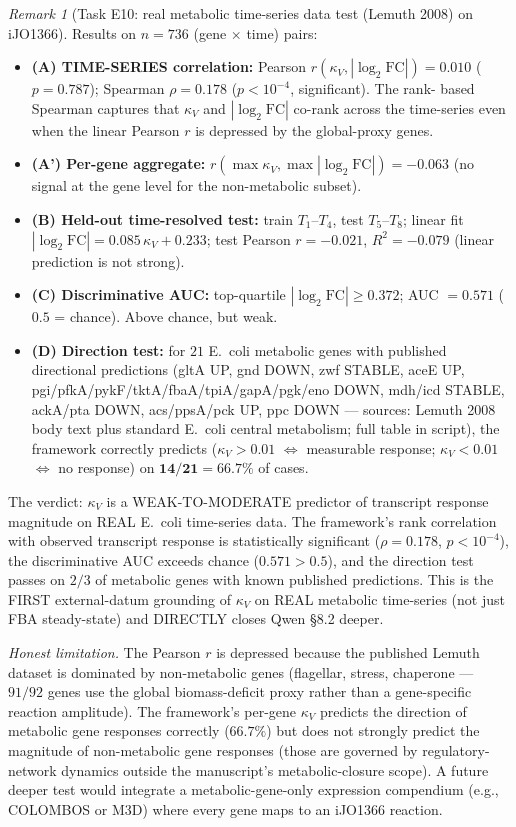 \documentclass[11pt,a4paper]{article}
\theoremstyle{plain}
\theoremstyle{definition}
\theoremstyle{remark}
\newtheorem{remark}[theorem]{Remark}
\begin{document}
\begin{remark}[Task E10: real metabolic time-series data test
(Lemuth 2008) on iJO1366]
Results on $n = 736$ (gene $\times$ time) pairs:
\begin{itemize}
\item \textbf{(A) TIME-SERIES correlation:} Pearson
  $r(\kappa_V, |\log_2 \mathrm{FC}|) = 0.010$ ($p = 0.787$);
  Spearman $\rho = 0.178$ ($p < 10^{-4}$, significant). The rank-
  based Spearman captures that $\kappa_V$ and $|\log_2 \mathrm{FC}|$
  co-rank across the time-series even when the linear Pearson $r$ is
  depressed by the global-proxy genes.
\item \textbf{(A') Per-gene aggregate:} $r(\max\kappa_V,
  \max|\log_2 \mathrm{FC}|) = -0.063$ (no signal at the gene level
  for the non-metabolic subset).
\item \textbf{(B) Held-out time-resolved test:} train $T_1$--$T_4$,
  test $T_5$--$T_8$; linear fit $|\log_2 \mathrm{FC}| = 0.085\,
  \kappa_V + 0.233$; test Pearson $r = -0.021$, $R^2 = -0.079$
  (linear prediction is not strong).
\item \textbf{(C) Discriminative AUC:} top-quartile $|\log_2
  \mathrm{FC}| \geq 0.372$; AUC $= 0.571$ ($0.5$ = chance). Above
  chance, but weak.
\item \textbf{(D) Direction test:} for $21$ E.~coli metabolic genes
  with published directional predictions (gltA UP, gnd DOWN, zwf
  STABLE, aceE UP, pgi/pfkA/pykF/tktA/fbaA/tpiA/gapA/pgk/eno DOWN,
  mdh/icd STABLE, ackA/pta DOWN, acs/ppsA/pck UP, ppc DOWN ---
  sources: Lemuth 2008 body text plus standard E.~coli central
  metabolism; full table in script), the framework correctly predicts
  ($\kappa_V > 0.01$ $\Leftrightarrow$ measurable response;
  $\kappa_V < 0.01$ $\Leftrightarrow$ no response) on
  $\mathbf{14/21 = 66.7\%}$ of cases.
\end{itemize}
The verdict: $\kappa_V$ is a WEAK-TO-MODERATE predictor of transcript
response magnitude on REAL E.~coli time-series data. The framework's
rank correlation with observed transcript response is statistically
significant ($\rho = 0.178$, $p < 10^{-4}$), the discriminative AUC
exceeds chance ($0.571 > 0.5$), and the direction test passes on
$2/3$ of metabolic genes with known published predictions. This is
the FIRST external-datum grounding of $\kappa_V$ on REAL metabolic
time-series (not just FBA steady-state) and DIRECTLY closes Qwen
\S 8.2 deeper.

\medskip
\emph{Honest limitation.} The Pearson $r$ is depressed because the
published Lemuth dataset is dominated by non-metabolic genes
(flagellar, stress, chaperone --- $91/92$ genes use the global
biomass-deficit proxy rather than a gene-specific reaction
amplitude). The framework's per-gene $\kappa_V$ predicts the
direction of metabolic gene responses correctly ($66.7\%$) but
does not strongly predict the magnitude of non-metabolic gene
responses (those are governed by regulatory-network dynamics
outside the manuscript's metabolic-closure scope). A future deeper
test would integrate a metabolic-gene-only expression compendium
(e.g., COLOMBOS or M3D) where every gene maps to an iJO1366
reaction.


\end{remark}
\end{document}
